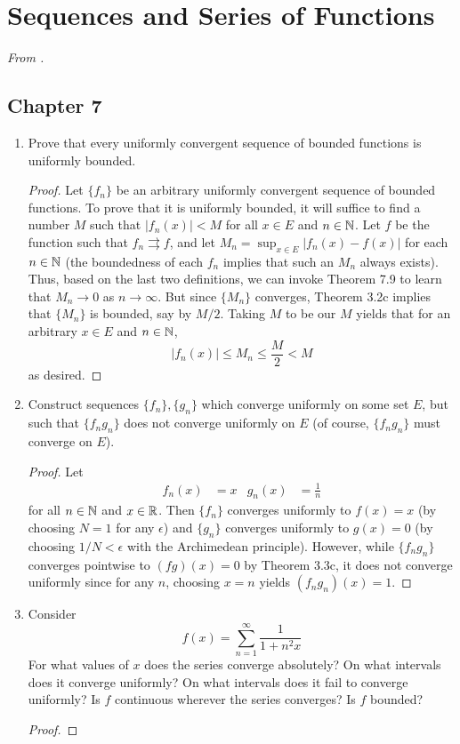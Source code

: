 \documentclass[../psets.tex]{subfiles}
\begin{document}
\section{Sequences and Series of Functions}
\emph{From \textcite{bib:Rudin}.}
\subsection*{Chapter 7}
\begin{enumerate}[label={\textbf{\arabic*.}}]
    \item {}Prove that every uniformly convergent sequence of bounded functions is uniformly bounded.
    \begin{proof}
        Let $\{f_n\}$ be an arbitrary uniformly convergent sequence of bounded functions. To prove that it is uniformly bounded, it will suffice to find a number $M$ such that $|f_n(x)|<M$ for all $x\in E$ and $n\in\mathbb{N}$. Let $f$ be the function such that $f_n\rightrightarrows f$, and let $M_n=\sup_{x\in E}|f_n(x)-f(x)|$ for each $n\in\mathbb{N}$ (the boundedness of each $f_n$ implies that such an $M_n$ always exists). Thus, based on the last two definitions, we can invoke Theorem 7.9 to learn that $M_n\to 0$ as $n\to\infty$. But since $\{M_n\}$ converges, Theorem 3.2c implies that $\{M_n\}$ is bounded, say by $M/2$. Taking $M$ to be our $M$ yields that for an arbitrary $x\in E$ and $n\in\mathbb{N}$,
        \begin{equation*}
            |f_n(x)| \leq M_n \leq \frac{M}{2} < M
        \end{equation*}
        as desired.
    \end{proof}
    \item Construct sequences $\{f_n\},\{g_n\}$ which converge uniformly on some set $E$, but such that $\{f_ng_n\}$ does not converge uniformly on $E$ (of course, $\{f_ng_n\}$ must converge on $E$).
    \begin{proof}
        Let
        \begin{align*}
            f_n(x) &= x&
            g_n(x) &= \frac{1}{n}
        \end{align*}
        for all $n\in\mathbb{N}$ and $x\in\mathbb{R}$. Then $\{f_n\}$ converges uniformly to $f(x)=x$ (by choosing $N=1$ for any $\epsilon$) and $\{g_n\}$ converges uniformly to $g(x)=0$ (by choosing $1/N<\epsilon$ with the Archimedean principle). However, while $\{f_ng_n\}$ converges pointwise to $(fg)(x)=0$ by Theorem 3.3c, it does not converge uniformly since for any $n$, choosing $x=n$ yields $(f_ng_n)(x)=1$.
    \end{proof}
    \item Consider
    \begin{equation*}
        f(x) = \sum_{n=1}^\infty\frac{1}{1+n^2x}
    \end{equation*}
    For what values of $x$ does the series converge absolutely? On what intervals does it converge uniformly? On what intervals does it fail to converge uniformly? Is $f$ continuous wherever the series converges? Is $f$ bounded?
    \begin{proof}


\end{proof}
\end{enumerate}
\end{document}
